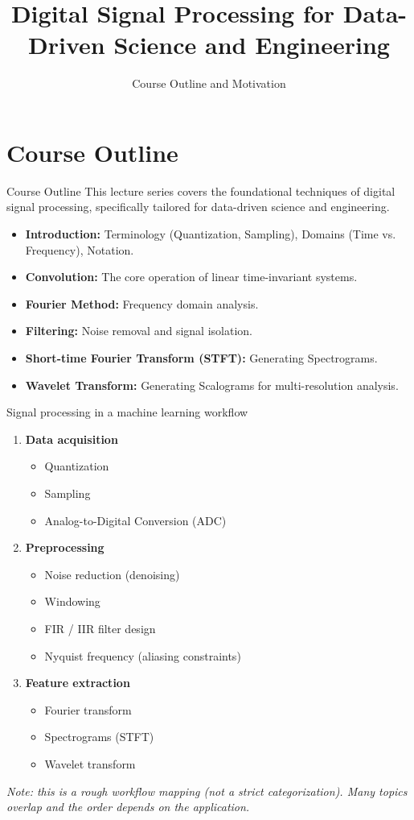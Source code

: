 \documentclass[aspectratio=169]{beamer}
\title{Digital Signal Processing for Data-Driven Science and Engineering}
\subtitle{Course Outline and Motivation}
\author{}
\date{}
\begin{document}
\begin{frame}
  \titlepage
\end{frame}

\section{Course Outline}
\begin{frame}{Course Outline}
This lecture series covers the foundational techniques of digital signal processing, specifically tailored for data-driven science and engineering.
\begin{itemize}
    \item \textbf{Introduction:} Terminology (Quantization, Sampling), Domains (Time vs. Frequency), Notation.
    \item \textbf{Convolution:} The core operation of linear time-invariant systems.
    \item \textbf{Fourier Method:} Frequency domain analysis.
    \item \textbf{Filtering:} Noise removal and signal isolation.
    \item \textbf{Short-time Fourier Transform (STFT):} Generating Spectrograms.
    \item \textbf{Wavelet Transform:} Generating Scalograms for multi-resolution analysis.
\end{itemize}
\end{frame}

\begin{frame}{Signal processing in a machine learning workflow}
\small
\begin{enumerate}
  \item \textbf{Data acquisition}
  \begin{itemize}
    \item Quantization
    \item Sampling
    \item Analog-to-Digital Conversion (ADC)
  \end{itemize}

  \item \textbf{Preprocessing}
  \begin{itemize}
    \item Noise reduction (denoising)
    \item Windowing
    \item FIR / IIR filter design
    \item Nyquist frequency (aliasing constraints)
  \end{itemize}

  \item \textbf{Feature extraction}
  \begin{itemize}
    \item Fourier transform
    \item Spectrograms (STFT)
    \item Wavelet transform
  \end{itemize}
\end{enumerate}

\vfill
{\footnotesize\itshape Note: this is a rough workflow mapping (not a strict categorization). Many topics overlap and the order depends on the application.}
\end{frame}
\end{document}
